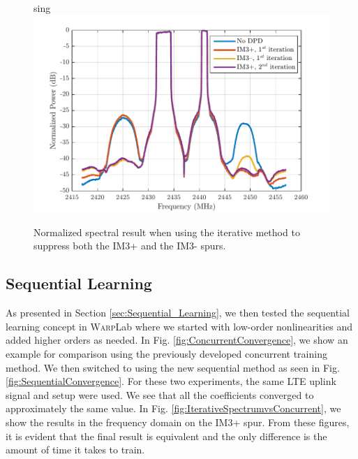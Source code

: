 \begin{figure}[t!] 
\centering
sing \includegraphics[width=0.9\columnwidth]{Figures/RightThenLeft_NEW}
\caption{Normalized spectral result when using the iterative method to suppress both the IM3+ and the IM3- spurs.}
\label{fig:RightThenLeft}
\end{figure}

\subsection{Sequential Learning}
As presented in Section \ref{sec:Sequential_Learning}, we then tested the sequential learning concept in \textsc{Warp}Lab where we started with low-order nonlinearities and added higher orders as needed. 
In Fig. \ref{fig:ConcurrentConvergence}, we show an example for comparison using the previously developed concurrent training method. 
We then switched to using the new sequential method as seen in Fig. \ref{fig:SequentialConvergence}. For these two experiments, the same LTE uplink signal and setup were used. 
We see that all the coefficients converged to approximately the same value. 
In Fig. \ref{fig:IterativeSpectrumvsConcurrent}, we show the results in the frequency domain on the IM3+ spur. 
From these figures, it is evident that the final result is equivalent and the only difference is the amount of time it takes to train.

